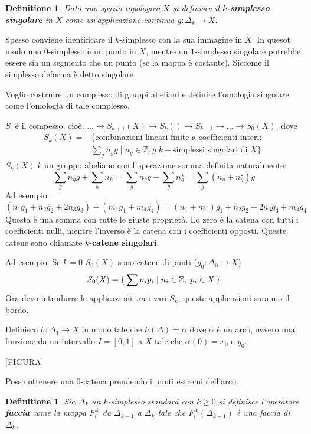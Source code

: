 \documentclass{article}
\newtheorem{definition}[theorem]{Definitione}
\newcommand{\Z}{\mathbb{Z}}
\begin{document}
\begin{definition}
  Dato uno spazio topologico $ X $ si definisce il \textbf{$ k $-simplesso singolare}
  in $ X $ come un'applicazione continua $ g: \Delta_k \to X $.
\end{definition}
Spesso conviene identificare il $ k $-simplesso con la sua immagine in $ X $.
In quesot modo uno $ 0 $-simplesso è un punto in $ X $, mentre un $ 1 $-simplesso singolare potrebbe essere sia un segmento che un punto (se la mappa è costante). Siccome
il simplesso deforma è detto singolare.

Voglio costruire un complesso di gruppi abeliani e definire l'omologia singolare come l'omologia di tale complesso.

$ S_\cdot $ è il compesso, cioè: $ \dots \to S_{k+1}(X) \to S_k() \to S_{k-1} \to \dots \to S_0(X) $, dove
\begin{align*}
  S_k(X) ={}& \{\text{combinazioni lineari finite a coefficienti interi: } \\
         & \sum_g n_g g \;|\; n_g \in \Z, g \; k-\text{simplessi singolari di } X \}
\end{align*}
$ S_k(X) $ è un gruppo abeliano con l'operazione somma definita naturalmente:
\[
  \sum_g n_g g + \sum_h n_h =   \sum_g n_g g + \sum_g n_g^\star = \sum_g (n_g + n_g^\star)g
\]
Ad esempio:
\[
  (n_1 g_1 + n_2 g_2 + 2 n_3 g_3) + (m_1 g_1 + m_4 g_4) = (n_1 + m_1)g_1 + n_2 g_2 + 2 n_3 g_3 + m_4 g_4
\]
Questa è una somma con tutte le giuste proprietà. Lo zero è la catena con tutti i coefficienti nulli,
mentre l'inverso è la catena con i coefficienti opposti.
Queste catene sono chiamate $ k $-\textbf{catene singolari}.

Ad esempio:
Se $ k = 0 $ $ S_0(X) $ sono catene di punti ($ g_0 : \Delta_0 \to X $)
\[
  S_0(X) = \set { \sum n_i p_i | n_i \in \Z, \; p_i \in X}
\]
Ora devo introdurre le applicazioni tra i vari $ S_k $, queste applicazioni saranno il bordo.

Definisco $ h: \Delta_1 \to X $ in modo tale che $ h(\Delta) = \alpha $ dove $ \alpha $ è un arco, ovvero una funzione
da un intervallo $ I = [0,1] $ a $ X $ tale che $ \alpha(0) = x_0 $ e $ y_0 $.

[FIGURA]

Posso ottenere una $ 0 $-catena prendendo i punti estremi dell'arco.

\begin{definition}
  Sia $ \Delta_k $ un $ k $-simplesso standard con $ k \geq 0 $ si definisce l'operatore \textbf{faccia} come
  la mappa $ F_i^{\;k} $ da $ \Delta_{k-1} $ a $ \Delta_k $ tale che $ F_i^{\;k}(\Delta_{k-1}) $ è una faccia di $ \Delta_k $.
\end{definition}
\end{document}
